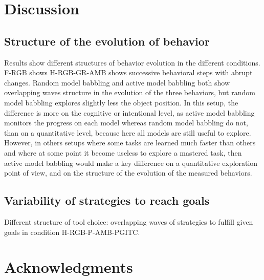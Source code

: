 \documentclass[10pt,letterpaper]{article}
\begin{document}
%


\section{Discussion}

	\subsection{Structure of the evolution of behavior}
	
		Results show different structures of behavior evolution in the different conditions.
		F-RGB shows 
		H-RGB-GR-AMB shows successive behavioral steps with abrupt changes.
		Random model babbling and active model babbling both show overlapping waves structure in the evolution of the three behaviors, 
		but random model babbling explores slightly less the object position.
		In this setup, the difference is more on the cognitive or intentional level, as active model babbling monitors the progress on each model whereas random model babbling do not, than on a quantitative level, 
		because here all models are still useful to explore.
		However, in others setups where some tasks are learned much faster than others and where at some point it become useless to explore a mastered task, then active model babbling would
		make a key difference on a quantitative exploration point of view, and on the structure of the evolution of the measured behaviors.
	
	
	\subsection{Variability of strategies to reach goals}
	
		Different structure of tool choice: overlapping waves of strategies to fulfill given goals in condition H-RGB-P-AMB-PGITC.
	
	
%



\section{Acknowledgments}

%






\setlength{\bibleftmargin}{.125in}
\setlength{\bibindent}{-\bibleftmargin}


\end{document}

